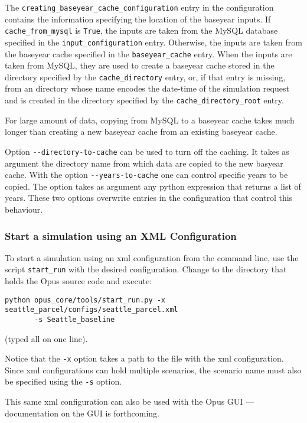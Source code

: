 The \verb|creating_baseyear_cache_configuration| entry in the configuration
contains the information specifying the location of the baseyear inputs.  
If \verb|cache_from_mysql| is \verb|True|, the inputs are taken from
the MySQL database specified in the \verb|input_configuration| entry. 
Otherwise, the inputs are taken from the baseyear cache specified in the
\verb|baseyear_cache| entry.  When the inputs are taken from MySQL, they are
used to create a baseyear cache stored in the directory specified by the
\verb|cache_directory| entry, or, if that entry is missing, from an directory
whose name encodes the date-time of the simulation request and is created in the
directory specified by the \verb|cache_directory_root| entry.  

For large amount of data, copying from MySQL to a baseyear cache takes much
longer than creating a new baseyear cache from an existing baseyear cache.  

Option \verb|--directory-to-cache| 
can be used to turn off the caching. It takes as argument the directory name
from which data are copied to the new basyear cache. With
the option \verb|--years-to-cache| one can control specific years to be
copied. The option takes as argument any python expression that returns a list
of years. These two options overwrite entries in the configuration that control
this behaviour.

\subsubsection{Start a simulation using an XML Configuration}
\label{sec:start-simulation-xml}

To start a simulation using an xml configuration from the command line, use
the script \verb|start_run| with the desired configuration.  Change to the
directory that holds the Opus source code and execute:
\begin{verbatim}
python opus_core/tools/start_run.py -x seattle_parcel/configs/seattle_parcel.xml 
       -s Seattle_baseline
\end{verbatim}
(typed all on one line).

Notice that the \verb|-x| option takes a path to the file with the xml
configuration.  Since xml configurations can hold multiple scenarios, the
scenario name must also be specified using the \verb|-s| option.

This same xml configuration can also be used with the Opus GUI ---
documentation on the GUI is forthcoming.

